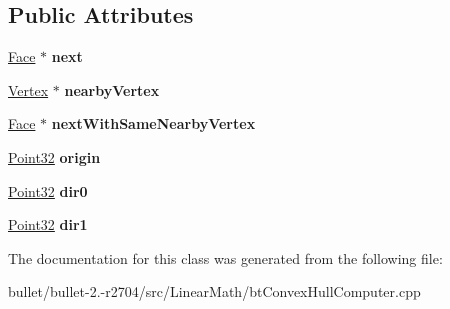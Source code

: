 \subsection*{Public Attributes}
\begin{DoxyCompactItemize}
\item 
\hypertarget{classbt_convex_hull_internal_1_1_face_acbddb68e9a6bc35235c1a557ad908e11}{\hyperlink{classbt_convex_hull_internal_1_1_face}{Face} $\ast$ {\bfseries next}}\label{classbt_convex_hull_internal_1_1_face_acbddb68e9a6bc35235c1a557ad908e11}

\item 
\hypertarget{classbt_convex_hull_internal_1_1_face_a0d19b988a641599b38d6ec2e84a98347}{\hyperlink{classbt_convex_hull_internal_1_1_vertex}{Vertex} $\ast$ {\bfseries nearby\+Vertex}}\label{classbt_convex_hull_internal_1_1_face_a0d19b988a641599b38d6ec2e84a98347}

\item 
\hypertarget{classbt_convex_hull_internal_1_1_face_a0faf4bf1fbed371bfe738116ca05a241}{\hyperlink{classbt_convex_hull_internal_1_1_face}{Face} $\ast$ {\bfseries next\+With\+Same\+Nearby\+Vertex}}\label{classbt_convex_hull_internal_1_1_face_a0faf4bf1fbed371bfe738116ca05a241}

\item 
\hypertarget{classbt_convex_hull_internal_1_1_face_a0ffa6b88943115a721e1fc5447319eeb}{\hyperlink{classbt_convex_hull_internal_1_1_point32}{Point32} {\bfseries origin}}\label{classbt_convex_hull_internal_1_1_face_a0ffa6b88943115a721e1fc5447319eeb}

\item 
\hypertarget{classbt_convex_hull_internal_1_1_face_a25facf936057bae8d480e04563a1df68}{\hyperlink{classbt_convex_hull_internal_1_1_point32}{Point32} {\bfseries dir0}}\label{classbt_convex_hull_internal_1_1_face_a25facf936057bae8d480e04563a1df68}

\item 
\hypertarget{classbt_convex_hull_internal_1_1_face_a2f47cc84817fa5e93d4b9925760abc6a}{\hyperlink{classbt_convex_hull_internal_1_1_point32}{Point32} {\bfseries dir1}}\label{classbt_convex_hull_internal_1_1_face_a2f47cc84817fa5e93d4b9925760abc6a}

\end{DoxyCompactItemize}


The documentation for this class was generated from the following file\+:\begin{DoxyCompactItemize}
\item 
bullet/bullet-\/2.-\/r2704/src/\+Linear\+Math/bt\+Convex\+Hull\+Computer.\+cpp\end{DoxyCompactItemize}
